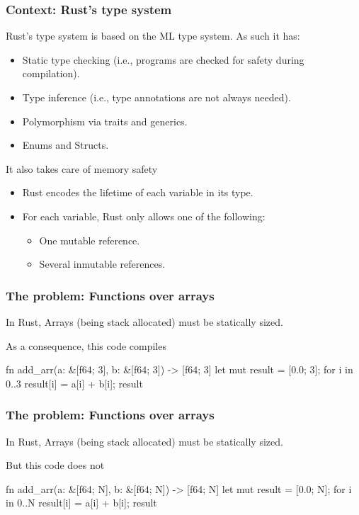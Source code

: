 \documentclass{beamer}
\begin{document}
\begin{frame}[fragile]
    \frametitle{Context: Rust's type system}
    Rust's type system is based on the ML type system. As such it has:
    \begin{itemize}
        \item Static type checking (i.e., programs are checked for safety during compilation).
        \item Type inference (i.e., type annotations are not always needed).
        \item Polymorphism via traits and generics.
        \item Enums and Structs.
    \end{itemize}
    It also takes care of memory safety
    \begin{itemize}
        \item Rust encodes the lifetime of each variable in its type.
        \item For each variable, Rust only allows one of the following:
            \begin{itemize}
                \item One mutable reference.
                \item Several inmutable references.
            \end{itemize}
    \end{itemize}
\end{frame}

\begin{frame}[fragile]
    \frametitle{The problem: Functions over arrays}
    In Rust, Arrays (being stack allocated) must be statically sized.

    As a consequence, this code compiles
    \begin{rustcode}
    fn add_arr(a: &[f64; 3], b: &[f64; 3]) -> [f64; 3] {
        let mut result = [0.0; 3];
        for i in 0..3 {
            result[i] = a[i] + b[i];
        }
        result
    }
    \end{rustcode}
\end{frame}

\begin{frame}[fragile]
    \frametitle{The problem: Functions over arrays}
    In Rust, Arrays (being stack allocated) must be statically sized.

    But this code does not
    \begin{rustcode}
    fn add_arr(a: &[f64; N], b: &[f64; N]) -> [f64; N] {
        let mut result = [0.0; N];
        for i in 0..N {
            result[i] = a[i] + b[i];
        }
        result
    }
    \end{rustcode}
\end{frame}
\end{document}

